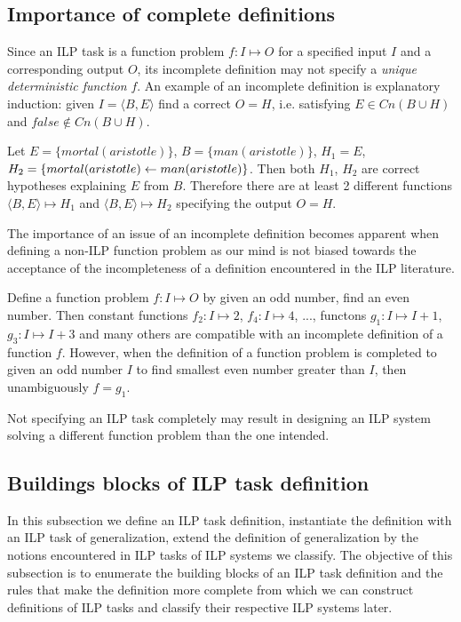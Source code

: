\subsection{Importance of complete definitions}
Since an ILP task is a function problem $f:I \mapsto O$ for a specified input $I$ and a corresponding output $O$, its incomplete definition may not specify a \emph{unique deterministic function} $f$. An example of an incomplete definition is explanatory induction: given $I=\langle B, E \rangle$ find a correct $O=H$, i.e. satisfying
$E \in Cn(B \cup H)$ and $false \not\in Cn(B \cup H)$.
\begin{exmp}\label{explanatory_induction_definition_incompleteness}
Let $E=\{mortal(aristotle)\}$, $B=\{man(aristotle)\}$,
$H_1=E$, $H_2=\{mortal(aristotle) \leftarrow man(aristotle)\}$.
Then both $H_1$, $H_2$ are correct hypotheses explaining $E$ from $B$. Therefore there are at least 2 different functions $\langle B, E \rangle \mapsto H_1$ and
$\langle B, E \rangle \mapsto H_2$ specifying the output $O=H$.
\end{exmp}

The importance of an issue of an incomplete definition becomes apparent when defining a non-ILP function problem as our mind is not biased towards the acceptance of the incompleteness of a definition encountered in the ILP literature.

\begin{exmp}
Define a function problem $f:I \mapsto O$ by given an odd number, find an even number. Then constant functions $f_2:I \mapsto 2$, $f_4:I \mapsto 4$, ..., functons $g_1:I \mapsto I+1$, $g_3:I \mapsto I+3$ and many others are compatible with an incomplete definition of a function $f$. However, when the definition of a function problem is completed to given an odd number $I$ to find smallest even number greater than $I$, then unambiguously $f=g_1$.
\end{exmp}

Not specifying an ILP task completely may result in designing an ILP system solving a different function problem than the one intended.

\subsection{Buildings blocks of ILP task definition}\label{subsec:building_blocks_of_ilp_task_definition}
In this subsection we define an ILP task definition, instantiate the definition with an ILP task of generalization, extend the definition of generalization by the notions encountered in ILP tasks of ILP systems we classify. The objective of this subsection is to enumerate the building blocks of an ILP task definition and the rules that make the definition more complete from which we can construct definitions of ILP tasks and classify their respective ILP systems later.

